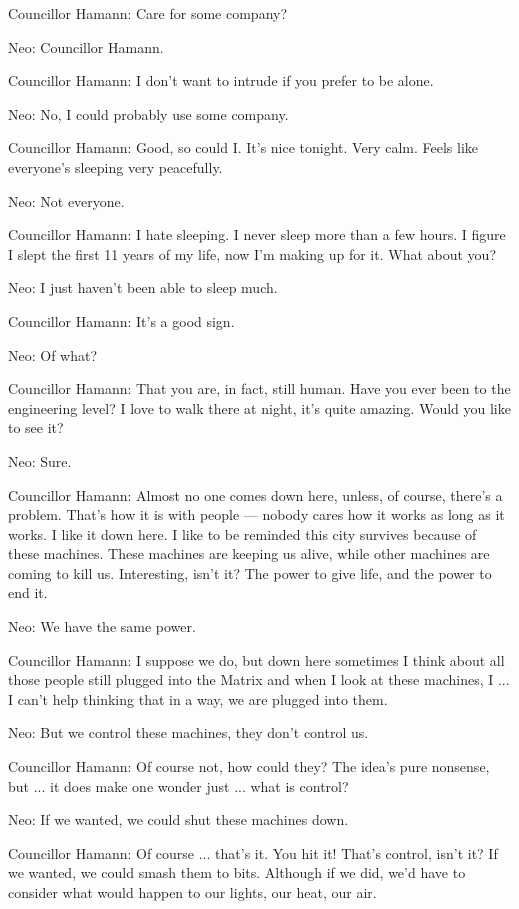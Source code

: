 \documentclass[UTF8]{ctexart}
\newenvironment{myquote}{\color{green} \setlength{\leftskip}{6em} \setlength{\rightskip}{4em} \setlength{\parindent}{-2em}}{\par}
\begin{document}
\begin{myquote}
Councillor Hamann: Care for some company?

Neo: Councillor Hamann.

Councillor Hamann: I don't want to intrude if you prefer to be alone.

Neo: No, I could probably use some company.

Councillor Hamann: Good, so could I. It's nice tonight. Very calm. Feels like everyone's sleeping very peacefully.

Neo: Not everyone.

Councillor Hamann: I hate sleeping. I never sleep more than a few hours. I figure I slept the first 11 years of my life, now I'm making up for it. What about you?

Neo: I just haven't been able to sleep much.

Councillor Hamann: It's a good sign.

Neo: Of what?

Councillor Hamann: That you are, in fact, still human. Have you ever been to the engineering level? I love to walk there at night, it's quite amazing. Would you like to see it?

Neo: Sure.

Councillor Hamann: Almost no one comes down here, unless, of course, there's a problem. That's how it is with people --- nobody cares how it works as long as it works. I like it down here. I like to be reminded this city survives because of these machines. These machines are keeping us alive, while other machines are coming to kill us. Interesting, isn't it? The power to give life, and the power to end it.

Neo: We have the same power.

Councillor Hamann: I suppose we do, but down here sometimes I think about all those people still plugged into the Matrix and when I look at these machines, I ... I can't help thinking that in a way, we are plugged into them.

Neo: But we control these machines, they don't control us.

Councillor Hamann: Of course not, how could they? The idea's pure nonsense, but ... it does make one wonder just ... what is control?

Neo: If we wanted, we could shut these machines down.

Councillor Hamann: Of course ... that's it. You hit it! That's control, isn't it? If we wanted, we could smash them to bits. Although if we did, we'd have to consider what would happen to our lights, our heat, our air.


\end{myquote}
\end{document}
